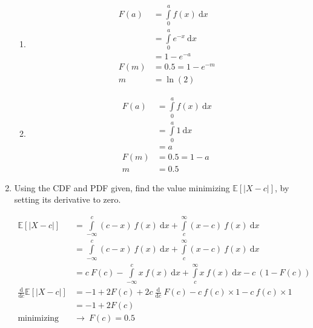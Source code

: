 \begin{enumerate}
		\begin{enumerate}
			
			\item 	\begin{align}
				F(a) &= \int\limits_{0}^{a} f(x)\ \mathrm{d}x \nonumber \\
				&= \int\limits_{0}^{a} e^{-x}\ \mathrm{d}x \nonumber \\
				&= 1 - e^{-a} \nonumber \\
				F(m) &= 0.5 = 1 - e^{-m} \nonumber \\
				m &= \ln (2)
			\end{align}
			
			\item 	\begin{align}
				F(a) &= \int\limits_{0}^{a} f(x)\ \mathrm{d}x \nonumber \\
				&= \int\limits_{0}^{a} 1\ \mathrm{d}x \nonumber \\
				&= a \nonumber \\
				F(m) &= 0.5 = 1 - a \nonumber \\
				m &= 0.5
			\end{align}
			
		\end{enumerate}
	
	
	
	\item Using the CDF and PDF given, find the value minimizing $ \mathbb{E}[\left|X - c\right|] $, by setting its derivative to zero.
	
		\begin{align}
			\mathbb{E}[\left|X - c\right|] &= \int\limits_{-\infty}^{c} (c - x)\ f(x)\ \mathrm{d}x + \int\limits_{c}^{\infty} (x - c)\ f(x)\ \mathrm{d}x \nonumber \\
			&= \int\limits_{-\infty}^{c} (c - x)\ f(x)\ \mathrm{d}x + \int\limits_{c}^{\infty} (x - c)\ f(x)\ \mathrm{d}x \nonumber \\
			&= c\ F(c) - \int\limits_{-\infty}^{c} x\ f(x)\ \mathrm{d}x + \int\limits_{c}^{\infty} x\ f(x)\ \mathrm{d}x - c\ (1 - F(c)) \nonumber \\
			\frac{\mathrm{d}}{\mathrm{d} c} \mathbb{E}[\left|X - c\right|] &= -1 + 2F(c) + 2c\  \frac{\mathrm{d}}{\mathrm{d} c}\ F(c) - c\ f(c) \times 1 - c\ f(c) \times 1 \nonumber \\
			&= -1 + 2F(c) \nonumber \\
			\text{minimizing}\ &\to\ F(c) = 0.5
		\end{align}
	

\end{enumerate}
